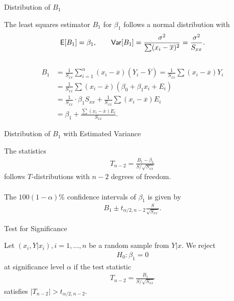 \begin{frame}{Distribution of $B_1$}

 The least squares estimator $B_1$ for $\beta_1$ follows a normal distribution with
\footnotesize
\begin{align*}
\mathsf{E}[B_1] = \beta_1, \qquad \mathsf{Var}[B_1] = \frac{\sigma^2}{\sum (x_i-\overline{x})^2} = \frac{\sigma^2}{S_{xx}}.
\end{align*}\\
\normalsize
{}
\footnotesize
\begin{align*}
B_1 & = \frac{1}{S_{xx}} \sum_{i=1}^n(x_i-\overline{x})(Y_i-\overline{Y}) = \frac{1}{S_{xx}}\sum (x_i-\overline{x})Y_i \\
& = \frac{1}{S_{xx}} \sum (x_i-\overline{x})(\beta_0 + \beta_1 x_i + E_i) \\
& = \frac{1}{S_{xx}}\cdot \beta_1 S_{xx} + \frac{1}{S_{xx}} \sum (x_i-\overline{x})E_i \\
& = \beta_1 + \frac{\sum (x_i-\overline{x}) E_i}{S_{xx}}.
\end{align*}
\normalsize

\end{frame}

\begin{frame}{Distribution of $B_1$ with Estimated Variance}

\justifying
{} The statistics
\begin{align*}
T_{n-2} = \frac{B_1-\beta_1}{S/\sqrt{S_{xx}}}
\end{align*}
follows $T$-distributions with $n-2$ degrees of freedom. \\
~\\
 The $100(1-\alpha)\%$ confidence intervals of $\beta_1$ is given by
\begin{align*}
B_1 \pm t_{\alpha/2,n-2}\frac{S}{\sqrt{S_{xx}}}.
\end{align*}

\end{frame}

\begin{frame}{Test for Significance}

\justifying
{} Let $(x_i, Y|x_i), i = 1, \ldots, n$ be a random sample from $Y|x$. We reject
\begin{align*}
H_0: \beta_1 = 0
\end{align*}
at significance level $\alpha$ if the test statistic
\begin{align*}
T_{n-2} = \frac{B_1}{S/\sqrt{S_{xx}}}
\end{align*}
satisfies $|T_{n-2}| > t_{\alpha/2,n-2}$.

\end{frame}

